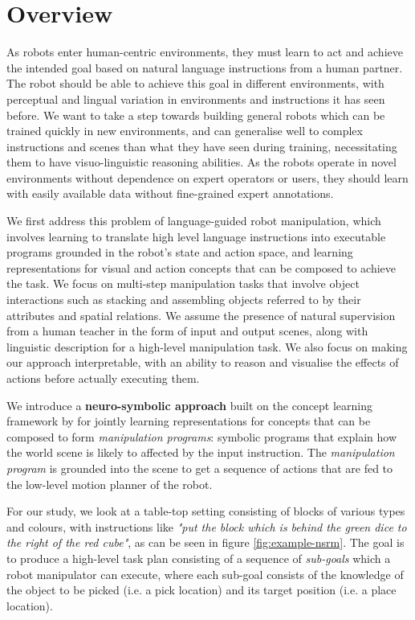 \section{Overview}

As robots enter human-centric environments, they must learn to act and achieve the intended goal based on natural language instructions from a human partner. The robot should be able to achieve this goal in different environments, with perceptual and lingual variation in environments and instructions it has seen before. We want to take a step towards building general robots which can be trained quickly in new environments, and can generalise well to complex instructions and scenes than what they have seen during training, necessitating them to have visuo-linguistic reasoning abilities. As the robots operate in novel environments without dependence on expert operators or users, they should learn with easily available data without fine-grained expert annotations.
%

We first address this problem of language-guided robot manipulation, which involves learning to translate high level language instructions into
executable programs grounded in the robot’s state and action space, and learning representations for visual and action concepts that can be composed to achieve the task.
%
We focus on multi-step manipulation tasks that involve object interactions such as stacking and assembling objects referred to by their attributes and spatial relations. 
%
We assume the presence of natural supervision from a human teacher in the form of input and output scenes, along with linguistic description for a high-level manipulation task. 
%
We also focus on making our approach interpretable, with an ability to reason and visualise the effects of actions before actually executing them.

We introduce a \textbf{neuro-symbolic approach} built on the concept learning framework by \cite{Mao2019NeuroSymbolic} for jointly learning representations for concepts that can be composed to form \emph{manipulation programs}: symbolic programs that explain how the world scene is likely to affected by the input instruction. The \emph{manipulation program} is grounded into the scene to get a sequence of actions that are fed to the low-level motion planner of the robot. 

For our study, we look at a table-top setting consisting of blocks of various types and colours, with instructions like \emph{"put the block which is behind the green dice to the right of the red cube"}, as can be seen in figure \ref{fig:example-nsrm}. The goal is to produce a high-level task plan consisting of a sequence of \textit{sub-goals} which a robot manipulator can execute, where each sub-goal consists of the knowledge of the object to be picked (i.e. a pick location) and its target position (i.e. a place location).
%

